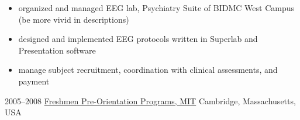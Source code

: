 \documentclass[10pt, a4]{friggeri-cv}
\begin{document}
\begin{entrylist}
{\begin{itemize}
		\item organized and managed EEG lab, Psychiatry Suite of BIDMC West Campus (be more vivid in descriptions)
		\item designed and implemented EEG protocols written in Superlab and Presentation software 
		\item manage subject recruitment, coordination with clinical assessments, and payment
	\end{itemize}
	}
  \entry
	{2005--2008}
	{\href{http://web.mit.edu/firstyear/}{Freshmen Pre-Orientation Programs, MIT}}
	{Cambridge, Massachusetts, USA}

\end{entrylist}
\end{document}
